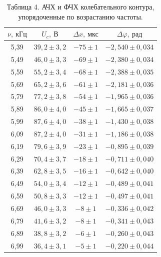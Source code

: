 \documentclass[a4paper]{article}
\begin{document}
\begin{enumerate}
\begin{table}[h!]
    \centering
    \begin{tabular}{|c|c|c|c|}
        \hline
        $\nu,\ \text{кГц}$ & $U_c,\ \text{В}$ & $\Delta x,\ \text{мкс}$ & $\Delta \varphi,\ \text{рад}$ \\ \hline
        5{,}39 & $39{,}2 \pm 3{,}2$ & $-75 \pm 1$ & $-2{,}540 \pm 0{,}034$ \\ \hline
        5{,}49 & $46{,}0 \pm 3{,}3$ & $-69 \pm 1$ & $-2{,}380 \pm 0{,}034$ \\ \hline
        5{,}59 & $55{,}2 \pm 3{,}4$ & $-68 \pm 1$ & $-2{,}388 \pm 0{,}035$ \\ \hline
        5{,}69 & $65{,}2 \pm 3{,}6$ & $-61 \pm 1$ & $-2{,}181 \pm 0{,}036$ \\ \hline
        5{,}79 & $77{,}2 \pm 3{,}8$ & $-54 \pm 1$ & $-1{,}965 \pm 0{,}036$ \\ \hline
        5{,}89 & $86{,}0 \pm 4{,}0$ & $-45 \pm 1$ & $-1{,}665 \pm 0{,}037$ \\ \hline
        5{,}99 & $87{,}6 \pm 4{,}0$ & $-38 \pm 1$ & $-1{,}430 \pm 0{,}038$ \\ \hline
        6{,}09 & $87{,}2 \pm 4{,}0$ & $-31 \pm 1$ & $-1{,}186 \pm 0{,}038$ \\ \hline
        6{,}19 & $79{,}6 \pm 3{,}9$ & $-23 \pm 1$ & $-0{,}895 \pm 0{,}039$ \\ \hline
        6{,}29 & $70{,}4 \pm 3{,}7$ & $-18 \pm 1$ & $-0{,}711 \pm 0{,}040$ \\ \hline
        6{,}39 & $62{,}8 \pm 3{,}5$ & $-16 \pm 1$ & $-0{,}642 \pm 0{,}040$ \\ \hline
        6{,}49 & $54{,}0 \pm 3{,}4$ & $-12 \pm 1$ & $-0{,}489 \pm 0{,}041$ \\ \hline
        6{,}59 & $50{,}8 \pm 3{,}3$ & $-12 \pm 1$ & $-0{,}497 \pm 0{,}041$ \\ \hline
        6{,}69 & $46{,}0 \pm 3{,}3$ & $-8 \pm 1$ & $-0{,}336 \pm 0{,}042$ \\ \hline
        6{,}79 & $41{,}6 \pm 3{,}2$ & $-8 \pm 1$ & $-0{,}341 \pm 0{,}043$ \\ \hline
        6{,}89 & $38{,}8 \pm 3{,}2$ & $-6 \pm 1$ & $-0{,}260 \pm 0{,}043$ \\ \hline
        6{,}99 & $36{,}4 \pm 3{,}1$ & $-5 \pm 1$ & $-0{,}220 \pm 0{,}044$ \\ \hline
    \end{tabular}
    \caption{Таблица 4. АЧХ и ФЧХ колебательного контура, упорядоченные по возрастанию частоты.}
    \label{tab:resonance_curves_sorted}
\end{table}


\end{enumerate}
\end{document}
